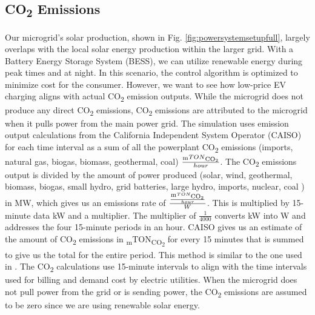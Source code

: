 \documentclass[conference, usletter]{IEEEtran}
\begin{document}
 \subsection{CO\textsubscript{2} Emissions}
 Our microgrid's solar production, shown in Fig. \ref{fig:powersystemsetupfull}, largely overlaps with the local solar energy production within the larger grid. With a Battery Energy Storage System (BESS), we can utilize renewable energy during peak times and at night. In this scenario, the control algorithm is optimized to minimize cost for the consumer. However, we want to see how low-price EV charging aligns with actual CO\textsubscript{2} emission outputs. While the microgrid does not produce any direct CO\textsubscript{2} emissions, CO\textsubscript{2} emissions are attributed to the microgrid when it pulls power from the main power grid. The simulation uses emission output calculations from the California Independent System Operator (CAISO) for each time interval as a sum of all the powerplant CO\textsubscript{2} emissions (imports, natural gas, biogas, biomass, geothermal, coal) $\frac{\textsubscript{m}TON\textsubscript{CO\textsubscript{2}}}{hour}$. The CO\textsubscript{2} emissions output is divided by the amount of power produced (solar, wind, geothermal, biomass, biogas, small hydro, grid batteries, large hydro, imports, nuclear, coal ) in MW, which gives us an emissions rate of $\frac{\frac{\textsubscript{m}TON\textsubscript{CO\textsubscript{2}}}{hour}}{W}$. This is multiplied by 15-minute data kW and a multiplier. The multiplier of  $\frac{1}{4000}$ converts kW into W and addresses the four 15-minute periods in an hour. CAISO gives us an estimate of the amount of CO\textsubscript{2} emissions in \textsubscript{m}TON\textsubscript{CO\textsubscript{2}} for every 15 minutes that is summed to give us the total for the entire period. This method is similar to the one used in \cite{garrido2021dynamic}. The CO\textsubscript{2} calculations use 15-minute intervals to align with the time intervals used for billing and demand cost by electric utilities. When the microgrid does not pull power from the grid or is sending power, the CO\textsubscript{2} emissions are assumed to be zero since we are using renewable solar energy.
\end{document}
